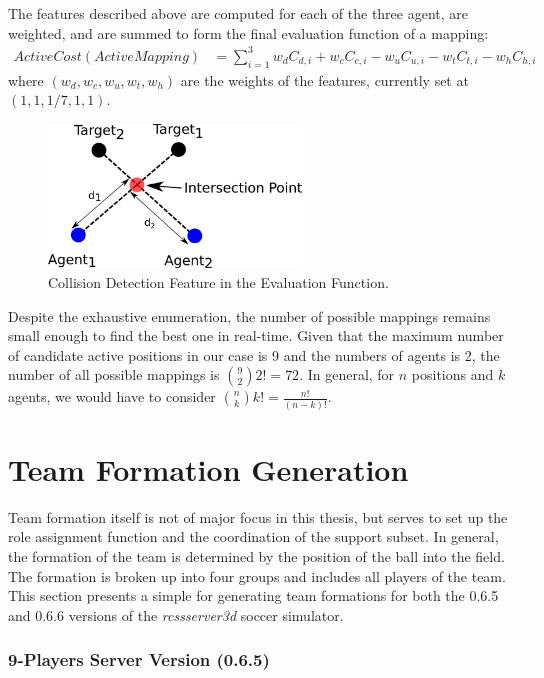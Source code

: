 The features described above are computed for each of the three agent, are weighted, and are summed to form the final evaluation function of a mapping: 
\begin{align*}
ActiveCost(ActiveMapping) &= \sum_{i=1}^3 w_dC_{d,i}+w_cC_{c,i}-w_uC_{u,i}-w_tC_{t,i}-w_hC_{h,i}
\end{align*}
where $(w_d,w_c,w_u,w_t,w_h)$ are the weights of the features, currently set at $(1,1,1/7,1,1)$.

\begin{figure}[t!]
\centering
  \includegraphics[width=0.6\textwidth]{Chapter4/figures/AvoidCollision.pdf}
  \caption{Collision Detection Feature in the Evaluation Function.} 
  \label{fig:AvoidCollision}
\end{figure}

Despite the exhaustive enumeration, the number of possible mappings remains small enough to find the best one in real-time. Given that the maximum number of candidate active positions in our case is 9 and the numbers of agents is 2, the number of all possible mappings is ${{9}\choose{2}}2! = 72$. In general, for $n$ positions and $k$ agents, we would have to consider ${{n}\choose{k}}k! = \frac{n!}{(n-k)!}$.




\section{Team Formation Generation}
Team formation itself is not of major focus in this thesis, but serves to set up the role assignment function and the coordination of the support subset. In general, the formation of the team is determined by the position of the ball into the field. The formation is broken up into four groups and includes all players of the team. This section presents a simple for generating team formations for both the 0.6.5 and 0.6.6 versions of the \textit{rcssserver3d} soccer simulator.

\subsubsection*{9-Players Server Version (0.6.5)}



